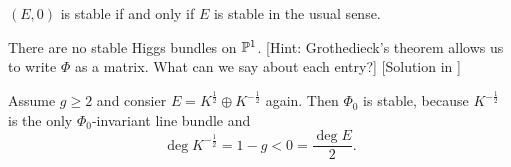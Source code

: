 \documentclass[A4paper, 12pt, british, reqno]{amsart}
\newcommand{\op}{\oplus}
\begin{document}
\begin{rem}
    $(E,0)$ is stable if and only if $E$ is stable in the usual sense.
\end{rem}

\begin{exe}
    There are no stable Higgs bundles on $\P^{1}$.
    [Hint: Grothedieck's theorem allows us to write $\Phi$ as a matrix. What can we say about each entry?]
    [Solution in \cite{hit87a}]
\end{exe}

\begin{exa}
    Assume $g\geqslant 2$ and consier $E=K^{\frac{1}{2}}\op K^{-\frac{1}{2}}$ again.
    Then $\Phi_{0}$ is stable, because $K^{-\frac{1}{2}}$ is the only $\Phi_{0}$-invariant line bundle and
    \[ \deg{K^{-\frac{1}{2}}}=1-g<0=\frac{\deg{E}}{2}. \]
\end{exa}
\end{document}
